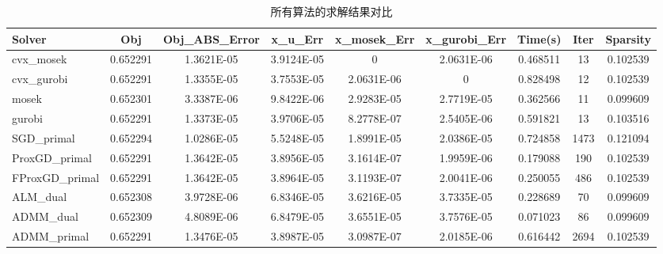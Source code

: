\documentclass[journal, a4paper]{IEEEtran}
\begin{document}
\begin{table}[h!]
\caption{所有算法的求解结果对比}
\centering
\begin{tabular}{lcccccccc}
\hline
\textbf{Solver} & \textbf{Obj} & \textbf{Obj\_ABS\_Error} & \textbf{x\_u\_Err} & \textbf{x\_mosek\_Err} & \textbf{x\_gurobi\_Err} & \textbf{Time(s)} & \textbf{Iter} & \textbf{Sparsity} \\ \hline
cvx\_mosek      & 0.652291     & 1.3621E-05               & 3.9124E-05         & 0                      & 2.0631E-06              & 0.468511         & 13            & 0.102539          \\
cvx\_gurobi     & 0.652291     & 1.3355E-05               & 3.7553E-05         & 2.0631E-06             & 0                       & 0.828498         & 12            & 0.102539          \\
mosek           & 0.652301     & 3.3387E-06               & 9.8422E-06         & 2.9283E-05             & 2.7719E-05              & 0.362566         & 11            & 0.099609          \\
gurobi          & 0.652291     & 1.3373E-05               & 3.9706E-05         & 8.2778E-07             & 2.5405E-06              & 0.591821         & 13            & 0.103516          \\
SGD\_primal     & 0.652294     & 1.0286E-05               & 5.5248E-05         & 1.8991E-05             & 2.0386E-05              & 0.724858         & 1473          & 0.121094          \\
ProxGD\_primal  & 0.652291     & 1.3642E-05               & 3.8956E-05         & 3.1614E-07             & 1.9959E-06              & 0.179088         & 190           & 0.102539          \\
FProxGD\_primal & 0.652291     & 1.3642E-05               & 3.8964E-05         & 3.1193E-07             & 2.0041E-06              & 0.250055         & 486           & 0.102539          \\
ALM\_dual       & 0.652308     & 3.9728E-06               & 6.8346E-05         & 3.6216E-05             & 3.7335E-05              & 0.228689         & 70            & 0.099609          \\
ADMM\_dual      & 0.652309     & 4.8089E-06               & 6.8479E-05         & 3.6551E-05             & 3.7576E-05              & 0.071023         & 86            & 0.099609          \\
ADMM\_primal    & 0.652291     & 1.3476E-05               & 3.8987E-05         & 3.0987E-07             & 2.0185E-06              & 0.616442         & 2694          & 0.102539          \\ \hline

\end{tabular}
\end{table}
\end{document}
